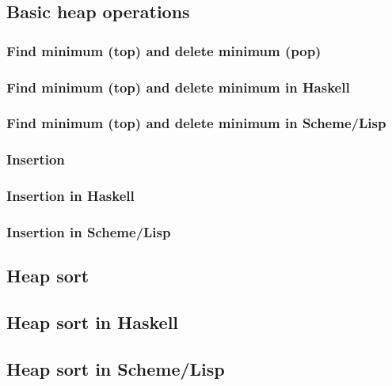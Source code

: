 \documentclass{article}
\begin{document}
\subsection{Basic heap operations}

\subsubsection{Find minimum (top) and delete minimum (pop)}

\subsubsection*{Find minimum (top) and delete minimum in Haskell}

\subsubsection*{Find minimum (top) and delete minimum in Scheme/Lisp}

\subsubsection{Insertion}

\subsubsection*{Insertion in Haskell}

\subsubsection*{Insertion in Scheme/Lisp}

\subsection{Heap sort}

\subsection*{Heap sort in Haskell}

\subsection*{Heap sort in Scheme/Lisp}
\end{document}
